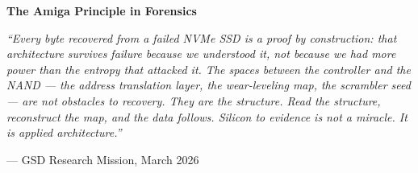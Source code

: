 \documentclass[11pt,letterpaper]{article}
\begin{document}
\begin{quotebox}
\textbf{\sffamily The Amiga Principle in Forensics}

\medskip

\textit{``Every byte recovered from a failed NVMe SSD is a proof by construction: that architecture survives failure because we understood it, not because we had more power than the entropy that attacked it. The spaces between the controller and the NAND --- the address translation layer, the wear-leveling map, the scrambler seed --- are not obstacles to recovery. They are the structure. Read the structure, reconstruct the map, and the data follows. Silicon to evidence is not a miracle. It is applied architecture.''}

\medskip

\noindent --- GSD Research Mission, March 2026
\end{quotebox}
\end{document}

